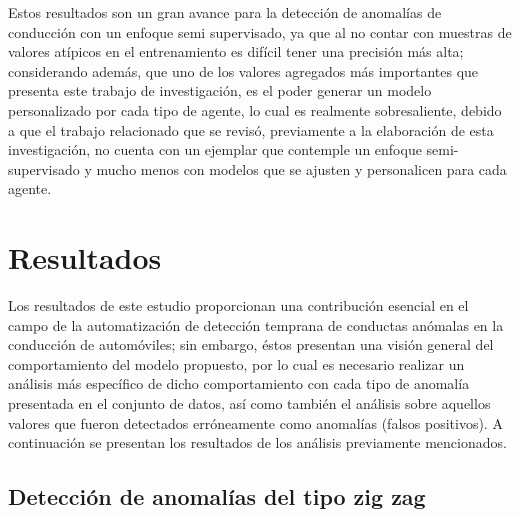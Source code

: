 Estos resultados son un gran avance para la detecci\'{o}n de anomal\'{i}as de conducci\'{o}n con un enfoque semi supervisado, ya que al no contar con muestras de valores at\'{i}picos en el entrenamiento es dif\'{i}cil tener una precisi\'{o}n m\'{a}s alta; considerando adem\'{a}s, que uno de los valores agregados m\'{a}s importantes que presenta este trabajo de investigaci\'{o}n, es el poder generar un modelo personalizado por cada tipo de agente, lo cual es realmente sobresaliente, debido a que el trabajo relacionado que se revis\'{o}, previamente a la elaboraci\'{o}n de esta investigaci\'{o}n, no cuenta con un ejemplar que contemple un enfoque semi-supervisado y mucho menos con modelos que se ajusten y personalicen para cada agente.


\section{Resultados}

Los resultados de este estudio proporcionan una contribuci\'{o}n esencial en el campo de la automatizaci\'{o}n de  detecci\'{o}n temprana de conductas an\'{o}malas en la conducci\'{o}n de autom\'{o}viles; sin embargo, \'{e}stos presentan una visi\'{o}n general del comportamiento del modelo propuesto, por lo cual es necesario realizar un an\'{a}lisis m\'{a}s espec\'{i}fico de dicho comportamiento con cada tipo de anomal\'{i}a presentada en el conjunto de datos, as\'{i} como tambi\'{e}n el an\'{a}lisis sobre aquellos valores que fueron detectados err\'{o}neamente como anomal\'{i}as (falsos positivos). A continuaci\'{o}n se presentan los resultados de los an\'{a}lisis previamente mencionados.


\subsection{Detecci\'{o}n de anomal\'{i}as del tipo zig zag}

